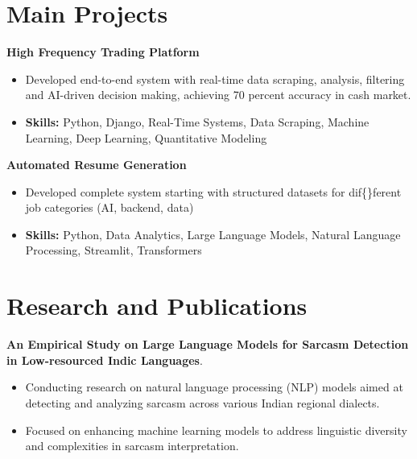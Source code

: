 \documentclass[a4paper,11pt]{article}
\begin{document}
\section{\textbf{Main Projects}}

\vspace{1mm}
  \textbf{High Frequency Trading Platform  }
\vspace{-1.5mm} %
\begin{itemize}
  \item Developed end-to-end system with real-time data scraping, analysis, filtering and AI-driven decision making, achieving 70 percent accuracy in cash market.
\vspace{-3mm}
  \item \textbf{Skills:} Python, Django, Real-Time Systems, Data Scraping, Machine Learning, Deep Learning, Quantitative Modeling
\end{itemize}


\vspace{1mm}
   \textbf{Automated Resume Generation }
\vspace{-1.5mm} %
\begin{itemize}
  \item Developed complete system starting with structured datasets for dif\{\}ferent job categories (AI, backend, data)
\vspace{-3mm}
  \item \textbf{Skills:} Python, Data Analytics, Large Language Models, Natural Language Processing, Streamlit, Transformers
\end{itemize}



\section{\textbf{Research and Publications} \hfill }
\vspace{1mm}
  \textbf{An Empirical Study on Large Language Models for Sarcasm Detection in Low-resourced Indic Languages}.
\vspace{-1mm} %
\begin{itemize}
  \item Conducting research on natural language processing (NLP) models aimed at detecting and analyzing sarcasm across various Indian regional dialects.
\vspace{-3mm}
  \item Focused on enhancing machine learning models to address linguistic diversity and complexities in sarcasm interpretation.
\end{itemize}
\end{document}
